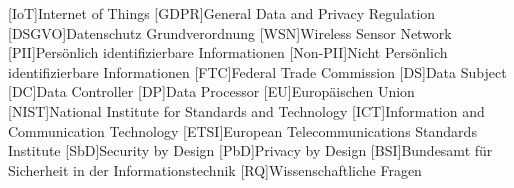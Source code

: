 

\begin{acronym}[DSGVO]

[IoT]{Internet of Things}
[GDPR]{General Data and Privacy Regulation}
[DSGVO]{Datenschutz Grundverordnung}
[WSN]{Wireless Sensor Network}
[PII]{Persönlich identifizierbare Informationen}
[Non-PII]{Nicht Persönlich identifizierbare Informationen}
[FTC]{Federal Trade Commission}
[DS]{Data Subject}
[DC]{Data Controller}
[DP]{Data Processor}
[EU]{Europäischen Union}
[NIST]{National Institute for Standards and Technology}
[ICT]{Information and Communication Technology}
[ETSI]{European Telecommunications Standards Institute}
[SbD]{Security by Design}
[PbD]{Privacy by Design}
[BSI]{Bundesamt für Sicherheit in der Informationstechnik}
[RQ]{Wissenschaftliche Fragen}

\end{acronym}